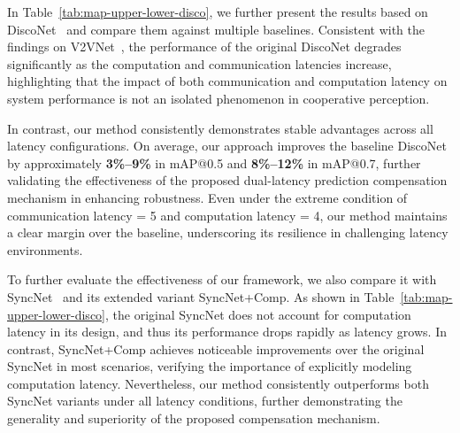 In Table~\ref{tab:map-upper-lower-disco}, we further present the results based on DiscoNet~\cite{li2021learning} and compare them against multiple baselines. Consistent with the findings on V2VNet~\cite{wang2020v2vnet}, the performance of the original DiscoNet degrades significantly as the computation and communication latencies increase, highlighting that the impact of both communication and computation latency on system performance is not an isolated phenomenon in cooperative perception.

In contrast, our method consistently demonstrates stable advantages across all latency configurations. On average, our approach improves the baseline DiscoNet by approximately \textbf{3\%--9\%} in mAP@0.5 and \textbf{8\%--12\%} in mAP@0.7, further validating the effectiveness of the proposed dual-latency prediction compensation mechanism in enhancing robustness. Even under the extreme condition of communication latency = 5 and computation latency = 4, our method maintains a clear margin over the baseline, underscoring its resilience in challenging latency environments.

To further evaluate the effectiveness of our framework, we also compare it with SyncNet~\cite{lei2022latency} and its extended variant SyncNet+Comp. As shown in Table~\ref{tab:map-upper-lower-disco}, the original SyncNet does not account for computation latency in its design, and thus its performance drops rapidly as latency grows. In contrast, SyncNet+Comp achieves noticeable improvements over the original SyncNet in most scenarios, verifying the importance of explicitly modeling computation latency. Nevertheless, our method consistently outperforms both SyncNet variants under all latency conditions, further demonstrating the generality and superiority of the proposed compensation mechanism.

